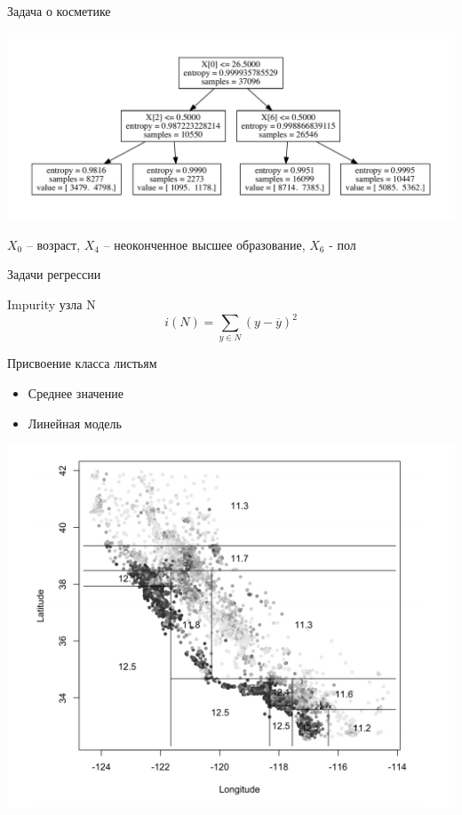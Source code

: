 \documentclass[10pt]{beamer}
\begin{document}
\begin{frame}{Задача о косметике}

\begin{center}
\includegraphics[scale=0.45]{images/model.pdf}
\end{center}

$X_0$ -- возраст, $X_4$ -- неоконченное высшее образование, $X_6$ - пол

\end{frame}

\begin{frame}{Задачи регрессии}

Impurity узла N
\[
i(N) = \sum_{y \in N} (y - \overline{y})^2
\]

Присвоение класса листьям
\begin{itemize}
\item Среднее значение
\item Линейная модель
\end{itemize}

\includegraphics[scale=0.4]{images/housing.png}

\end{frame}
\end{document}
